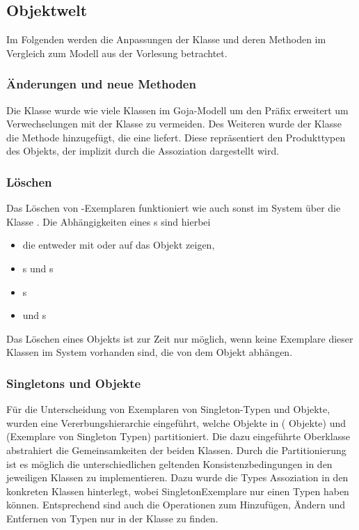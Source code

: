 \subsection{Objektwelt}
Im Folgenden werden die Anpassungen der Klasse  und deren Methoden im Vergleich zum Modell aus der Vorlesung betrachtet.


\subsubsection{Änderungen und neue Methoden}
Die Klasse  wurde wie viele Klassen im Goja-Modell um den Präfix  erweitert um Verwechselungen mit der Klasse  zu vermeiden.
Des Weiteren wurde der Klasse die Methode  hinzugefügt, die eine  liefert.
Diese  repräsentiert den Produkttypen des Objekts, der implizit durch die Assoziation  dargestellt wird.

\subsubsection{Löschen}
Das Löschen von -Exemplaren funktioniert wie auch sonst im System über die Klasse .
Die Abhängigkeiten eines s sind hierbei 
\begin{itemize}
\item {} die entweder mit  oder  auf das Objekt zeigen,
\item {}s und s
\item {}s
\item und s
\end{itemize}
Das Löschen eines Objekts ist zur Zeit nur möglich, wenn keine Exemplare dieser Klassen im System vorhanden sind, die von dem Objekt abhängen.

\subsubsection{Singletons und  Objekte}
Für die Unterscheidung von Exemplaren von Singleton-Typen und  Objekte, wurden eine Vererbungshierarchie eingeführt, welche Objekte in  ( Objekte)
und  (Exemplare von Singleton Typen) partitioniert. Die dazu eingeführte Oberklasse  abstrahiert die Gemeinsamkeiten der beiden Klassen. 
Durch die Partitionierung ist es möglich die unterschiedlichen geltenden Konsistenzbedingungen in den jeweiligen Klassen zu implementieren.
Dazu wurde die Types Assoziation in den konkreten Klassen hinterlegt, wobei SingletonExemplare nur einen Typen haben können.
Entsprechend sind auch die Operationen zum Hinzufügen, Ändern und Entfernen von Typen nur in der Klasse  zu finden.

